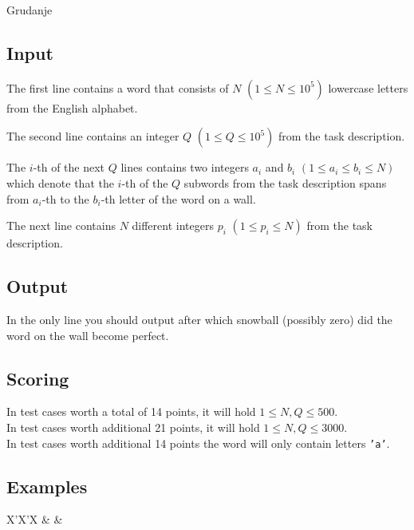 \begin{statement}[
  problempoints=70,
  timelimit=1 second,
  memorylimit=512 MiB,
]{Grudanje}
\subsection*{Input}
The first line contains a word that consists of $N$ $(1 \le N \le 10^5)$
lowercase letters from the English alphabet.

The second line contains an integer $Q$ $(1 \le Q \le 10^5)$ from the task
description.

The $i$-th of the next $Q$ lines contains two integers $a_i$ and $b_i$
$(1 \le a_i \le b_i \le N)$ which denote that the $i$-th of the $Q$ subwords
from the task description spans from $a_i$-th to the $b_i$-th letter of the
word on a wall.

The next line contains $N$ different integers $p_i$ $(1 \le p_i \le N)$ from
the task description.

\subsection*{Output}
In the only line you should output after which snowball (possibly zero) did
the word on the wall become perfect.

\subsection*{Scoring}
In test cases worth a total of 14 points, it will hold $1 \le N, Q \le 500$. \\
In test cases worth additional 21 points, it will hold $1 \le N, Q \le 3000$. \\
In test cases worth additional 14 points the word will only contain letters
\texttt{'a'}.

\subsection*{Examples}
\begin{tabularx}{\textwidth}{X'X'X}
 &
 &
\end{tabularx}


\end{statement}
